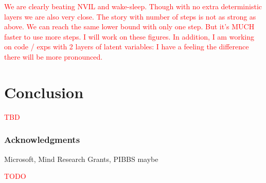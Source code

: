 \documentclass{article} %
\newcommand{\alert}[1]{\textcolor{red}{#1}}
\begin{document}
\alert{We are clearly beating NVIL and wake-sleep. Though with no extra deterministic layers we are also very close. The story with number of steps is not as strong as above. We can reach the same lower bound with only one step. But it's MUCH faster to use more steps. I will work on these figures. In addition, I am working on code / exps with 2 layers of latent variables: I have a feeling the difference there will be more pronounced.}

\section{Conclusion}

\alert{TBD}


\subsubsection*{Acknowledgments}
Microsoft, Mind Research Grants, PIBBS maybe

\alert{TODO}




\end{document}
